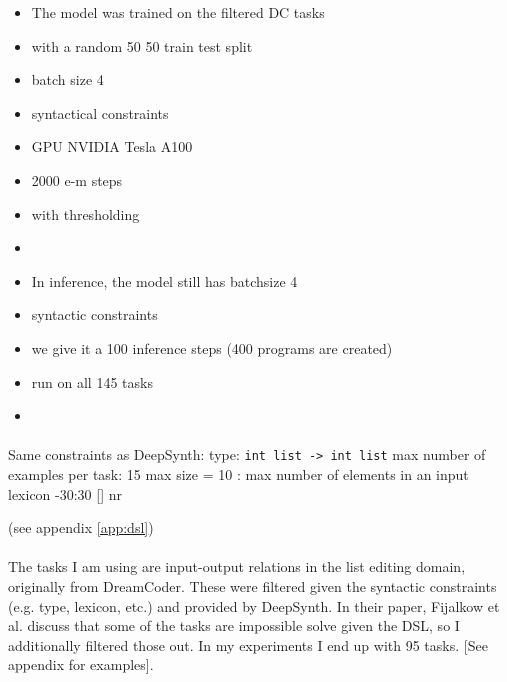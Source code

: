 \begin{itemize}
    \item The model was trained on the filtered DC tasks 
    \item with a random 50 50 train test split
    \item batch size 4
    \item syntactical constraints
    \item GPU NVIDIA Tesla A100
    \item 2000 e-m steps 
    \item with thresholding
    \item 
\end{itemize} 

\begin{itemize}
    \item In inference, the model still has batchsize 4
    \item syntactic constraints
    \item we give it a 100 inference steps (400 programs are created)
    \item run on all 145 tasks
    \item 
\end{itemize}





\paragraph{}
Same constraints as DeepSynth:
type: \texttt{int list -> int list}
max number of examples per task: 15
max size  = 10 : max number of elements in an input
lexicon -30:30 []
nr 

(see appendix \ref{app:dsl})
\paragraph{}

The tasks I am using are input-output relations in the list editing domain, originally from DreamCoder. These were filtered given the syntactic constraints (e.g. type, lexicon, etc.) and provided by DeepSynth. In their paper, Fijalkow et al. discuss that some of the tasks are impossible solve given the DSL, so I additionally filtered those out. In my experiments I end up with 95 tasks.
[See appendix for examples].

